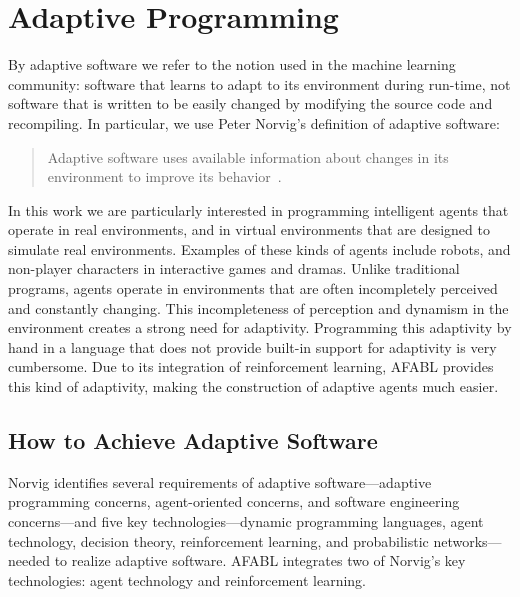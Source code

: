 \section{Adaptive Programming}

By adaptive software we refer to the notion used in the machine learning community: software that learns to adapt to its environment during run-time, not software that is written to be easily changed by modifying the source code and recompiling.  In particular, we use Peter Norvig's definition of adaptive software:

\begin{quote}
Adaptive software uses available information about changes in its
environment to improve its behavior~\cite{norvig1998adaptive}.
\end{quote}

In this work we are particularly interested in programming intelligent agents that operate in real environments, and in virtual environments that are designed to simulate real environments.  Examples of these kinds of agents include robots, and non-player characters in interactive games and dramas.  Unlike traditional programs, agents operate in environments that are often incompletely perceived and constantly changing.  This incompleteness of perception and dynamism in the environment creates a strong need for adaptivity.  Programming this adaptivity by hand in a language that does not provide built-in support for adaptivity is very cumbersome.  Due to its integration of reinforcement learning, AFABL provides this kind of adaptivity, making the construction of adaptive agents much easier.


\subsection{How to Achieve Adaptive Software}

Norvig identifies several requirements of adaptive soft\-ware---adaptive programming concerns, agent-oriented concerns, and software engineering concerns---and five key technologies---dynamic programming languages, agent technology, decision theory, reinforcement learning, and probabilistic networks---needed to realize adaptive software. AFABL integrates two of Norvig's key technologies: agent technology and reinforcement learning.


